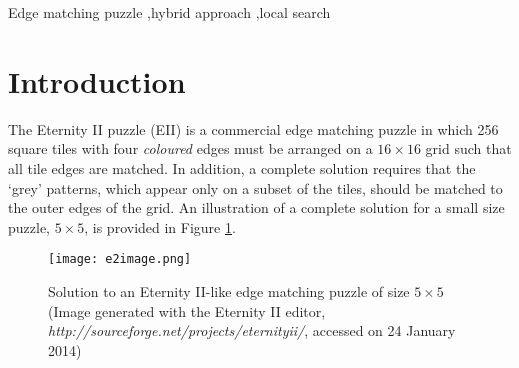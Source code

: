 \documentclass[preprint,12pt]{elsarticle}
\begin{document}
\begin{frontmatter}
\begin{abstract}
\end{abstract}

\begin{keyword}
Edge matching puzzle \sep hybrid approach \sep local search


\end{keyword}

\end{frontmatter}


\section{Introduction}
\label{sec:Intro}

\noindent 
The Eternity II puzzle (EII) is a commercial edge matching puzzle in which 256 square tiles with four \emph{coloured} edges must be arranged on a $16\times 16$ grid such that all tile edges are matched.
In addition, a complete solution requires that the `grey' patterns, which appear only on a subset of the tiles, should be matched to the outer edges of the grid.
An illustration of a complete solution for a small size puzzle, $5 \times 5$, is provided in Figure \ref{fig:e2image}.
\begin{figure}[h]
\centering
		\texttt{[image: e2image.png]}
	\caption{Solution to an Eternity II-like edge matching puzzle of size $5 \times 5$ (Image generated with the Eternity II editor, \textit{http://sourceforge.net/projects/eternityii/}, accessed on 24 January 2014)} %
\label{fig:e2image}
\end{figure}
\end{document}
